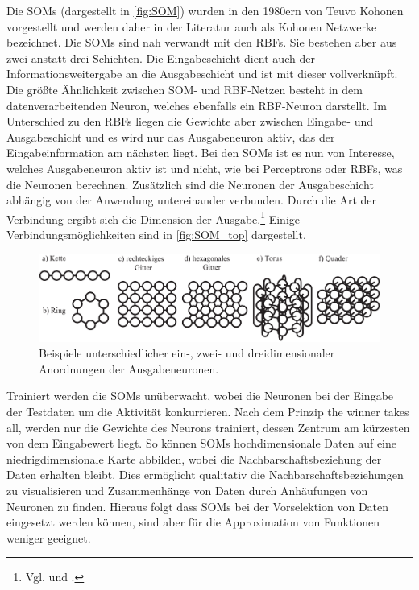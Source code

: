 Die SOMs (dargestellt in \autoref{fig:SOM}) wurden in den 1980ern von Teuvo Kohonen vorgestellt und werden daher in der Literatur auch als Kohonen Netzwerke bezeichnet. Die SOMs sind nah verwandt mit den RBFs. Sie bestehen aber aus zwei anstatt drei Schichten. Die Eingabeschicht dient auch der Informationsweitergabe an die Ausgabeschicht und ist mit dieser vollverknüpft. Die größte Ähnlichkeit zwischen SOM- und RBF-Netzen besteht in dem datenverarbeitenden Neuron, welches ebenfalls ein RBF-Neuron darstellt. Im Unterschied zu den RBFs liegen die Gewichte aber zwischen Eingabe- und Ausgabeschicht und es wird nur das Ausgabeneuron aktiv, das der Eingabeinformation am nächsten liegt.
Bei den SOMs ist es nun von Interesse, welches Ausgabeneuron aktiv ist und nicht, wie bei Perceptrons oder RBFs, was die Neuronen berechnen. Zusätzlich sind die Neuronen der Ausgabeschicht abhängig von der Anwendung untereinander verbunden. Durch die Art der Verbindung ergibt sich die Dimension der Ausgabe.\footnote{Vgl. \citet[102 ff]{Kruse15} und \citet[153 ff]{dkriesel07}.} Einige Verbindungsmöglichkeiten sind in \autoref{fig:SOM_top} dargestellt.
\begin{figure}[tb]
    \centering
        \includegraphics[width=1\textwidth]{Bilder/Netzwerke/som_top.png}
    \caption{Beispiele unterschiedlicher ein-, zwei- und dreidimensionaler Anordnungen der Ausgabeneuronen.\protect\footnotemark{}}
    \label{fig:SOM_top}
\end{figure}
\addtocounter{footnote}{-1}     %
\addtocounter{Hfootnote}{-1}    %
\wrapfigfoot{}

Trainiert werden die SOMs unüberwacht, wobei die Neuronen bei der Eingabe der Testdaten um die Aktivität konkurrieren. Nach dem Prinzip \glqq the winner takes all\grqq, werden nur die Gewichte des Neurons trainiert, dessen Zentrum am kürzesten von dem Eingabewert liegt.
So können SOMs hochdimensionale Daten auf eine niedrigdimensionale Karte abbilden, wobei die Nachbarschaftsbeziehung der Daten erhalten bleibt. Dies ermöglicht qualitativ die Nachbarschaftsbeziehungen zu visualisieren und Zusammenhänge von Daten durch Anhäufungen von Neuronen zu finden. Hieraus folgt dass SOMs bei der Vorselektion von Daten eingesetzt werden können, sind aber für die Approximation von Funktionen weniger geeignet.

